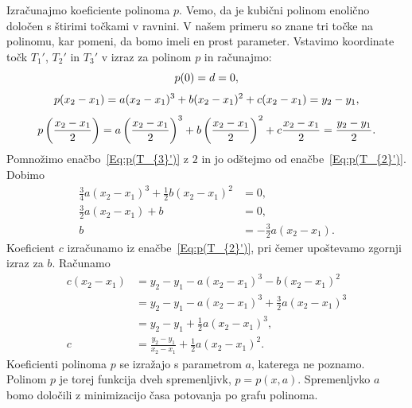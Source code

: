 \documentclass[a4paper]{article}
\begin{document}
Izračunajmo koeficiente polinoma $p$. Vemo, da je kubični polinom enolično določen s štirimi točkami v ravnini. V našem primeru so znane tri točke na polinomu, kar pomeni, da bomo imeli en prost parameter. Vstavimo koordinate točk $T_{1}'$, $T_{2}'$ in $T_{3}'$ v izraz za polinom $p$ in računajmo:
\begin{equation}
\label{Eq:p(T_{1}')}
p(0) = d = 0,
\end{equation}
%
\begin{equation}
\label{Eq:p(T_{2}')}
p(x_2-x_1) = a(x_2-x_1)^3+b(x_2-x_1)^2+c(x_2-x_1) = y_2-y_1,
\end{equation}
%
\begin{equation}
\label{Eq:p(T_{3}')}
p \left(\frac{x_2-x_1}{2} \right) = a \left(\frac{x_2-x_1}{2} \right)^3+b \left(\frac{x_2-x_1}{2} \right)^2+c \frac{x_2-x_1}{2} = \frac{y_2-y_1}{2}.
\end{equation}
%
Pomnožimo enačbo~\eqref{Eq:p(T_{3}')} z $2$ in jo odštejmo od enačbe~\eqref{Eq:p(T_{2}')}. Dobimo
\begin{align}
\frac{3}{4} a(x_2-x_1)^3 + \frac{1}{2} b(x_2-x_1)^2 &= 0, \nonumber \\
\frac{3}{2} a(x_2-x_1) + b &= 0, \nonumber \\
b &= -\frac{3}{2} a(x_2-x_1).
\end{align}
%
Koeficient $c$ izračunamo iz enačbe~\eqref{Eq:p(T_{2}')}, pri čemer upoštevamo zgornji izraz za $b$. Računamo
\begin{align}
c(x_2-x_1) &= y_2 - y_1 - a(x_2-x_1)^3 - b(x_2-x_1)^2 \nonumber \\
 &= y_2 - y_1 - a(x_2-x_1)^3 + \frac{3}{2} a(x_2-x_1)^3 \nonumber \\
 &= y_2 - y_1 + \frac{1}{2} a(x_2-x_1)^3, \nonumber \\
c &= \frac{y_2-y_1}{x_2-x_1} + \frac{1}{2} a(x_2-x_1)^2.
\end{align}
%
Koeficienti polinoma $p$ se izražajo s parametrom $a$, katerega ne poznamo. Polinom $p$ je torej funkcija dveh spremenljivk, $p = p(x,a)$. Spremenljvko $a$ bomo določili z minimizacijo časa potovanja po grafu polinoma.
\end{document}
